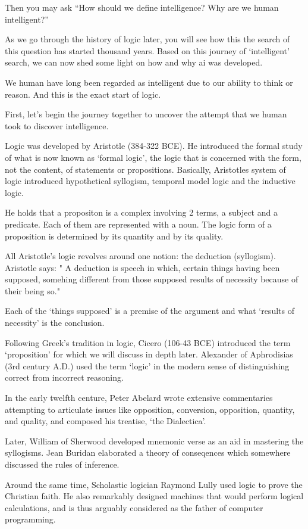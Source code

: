 \documentclass[]{book}
\theoremstyle{definition}
\theoremstyle{definition}
\theoremstyle{definition}
\theoremstyle{remark}
\begin{document}
Then you may ask ``How should we define intelligence? Why are we human
intelligent?''

As we go through the history of logic later, you will see how this the
search of this question has started thousand years. Based on this
journey of `intelligent' search, we can now shed some light on how and
why ai was developed.

We human have long been regarded as intelligent due to our ability to
think or reason. And this is the exact start of logic.

First, let's begin the journey together to uncover the attempt that we
human took to discover intelligence.

Logic was developed by Aristotle (384-322 BCE). He introduced the formal
study of what is now known as `formal logic', the logic that is
concerned with the form, not the content, of statements or propositions.
Basically, Aristotles system of logic introduced hypothetical syllogism,
temporal model logic and the inductive logic.

He holds that a propositon is a complex involving 2 terms, a subject and
a predicate. Each of them are represented with a noun. The logic form of
a proposition is determined by its quantity and by its quality.

All Aristotle's logic revolves around one notion: the deduction
(syllogism). Aristotle says: " A deduction is speech in which, certain
things having been supposed, somehing different from those supposed
results of necessity because of their being so."

Each of the `things supposed' is a premise of the argument and what
`results of necessity' is the conclusion.

Following Greek's tradition in logic, Cicero (106-43 BCE) introduced the
term `proposition' for which we will discuss in depth later. Alexander
of Aphrodisias (3rd century A.D.) used the term `logic' in the modern
sense of distinguishing correct from incorrect reasoning.

In the early twelfth centure, Peter Abelard wrote extensive commentaries
attempting to articulate issues like opposition, conversion, opposition,
quantity, and quality, and composed his treatise, `the Dialectica'.

Later, William of Sherwood developed mnemonic verse as an aid in
mastering the syllogisms. Jean Buridan elaborated a theory of
conseqences which somewhere discussed the rules of inference.

Around the same time, Scholastic logician Raymond Lully used logic to
prove the Christian faith. He also remarkably designed machines that
would perform logical calculations, and is thus arguably considered as
the father of computer programming.
\end{document}
